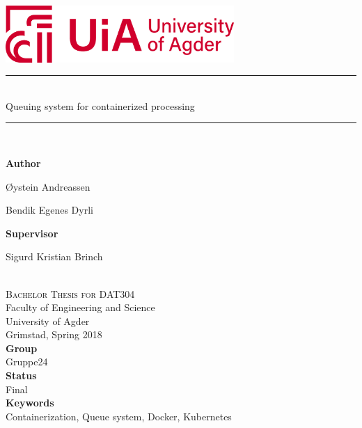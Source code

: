 \documentclass[../main.tex]{subfiles}
\begin{document}
\begin{titlepage}
\newcommand{\HRule}{\rule{\linewidth}{0.8mm}}
\center

\includegraphics[width=0.65\textwidth]{img/uia_eng.png}\\[2.5cm]
    
\HRule \\[0.5cm]
{ \huge Queuing system for containerized processing }\\[0.2cm]
\HRule \\[0.5cm]
 
\begin{minipage}[t]{0.4\textwidth}
\begin{flushleft} \large
\textbf{Author}

Øystein Andreassen

Bendik Egenes Dyrli


\end{flushleft}
\end{minipage}
\begin{minipage}[t]{0.4\textwidth}
\begin{flushright} \large

\textbf{Supervisor}

Sigurd Kristian Brinch
\end{flushright}
\end{minipage}\\[2cm]

\textsc{ Bachelor Thesis for DAT304 }\\[1cm]
Faculty of Engineering and Science \\ 
University of Agder \\
Grimstad, Spring 2018 \\[1cm]

\textbf{Group} \\
Gruppe24 \\ [1cm]

\textbf{Status} \\
Final \\ [1cm]

\textbf{Keywords} \\
Containerization, Queue system, Docker, Kubernetes \\ [1cm]


\end{titlepage}
\end{document}
